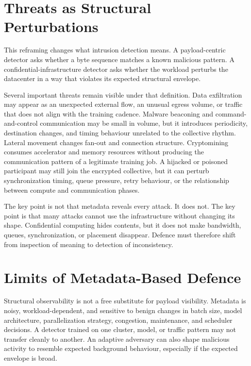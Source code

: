 \section{Threats as Structural Perturbations}
\label{sec:conf-structural-perturbations}

This reframing changes what intrusion detection means. A payload-centric detector asks whether a byte sequence matches a known malicious pattern. A confidential-infrastructure detector asks whether the workload perturbs the datacenter in a way that violates its expected structural envelope.

Several important threats remain visible under that definition. Data exfiltration may appear as an unexpected external flow, an unusual egress volume, or traffic that does not align with the training cadence. Malware beaconing and command-and-control communication may be small in volume, but it introduces periodicity, destination changes, and timing behaviour unrelated to the collective rhythm. Lateral movement changes fan-out and connection structure. Cryptomining consumes accelerator and memory resources without producing the communication pattern of a legitimate training job. A hijacked or poisoned participant may still join the encrypted collective, but it can perturb synchronization timing, queue pressure, retry behaviour, or the relationship between compute and communication phases.

The key point is not that metadata reveals every attack. It does not. The key point is that many attacks cannot use the infrastructure without changing its shape. Confidential computing hides contents, but it does not make bandwidth, queues, synchronization, or placement disappear. Defence must therefore shift from inspection of meaning to detection of inconsistency.

\section{Limits of Metadata-Based Defence}
\label{sec:conf-limits}

Structural observability is not a free substitute for payload visibility. Metadata is noisy, workload-dependent, and sensitive to benign changes in batch size, model architecture, parallelization strategy, congestion, maintenance, and scheduler decisions. A detector trained on one cluster, model, or traffic pattern may not transfer cleanly to another. An adaptive adversary can also shape malicious activity to resemble expected background behaviour, especially if the expected envelope is broad.

